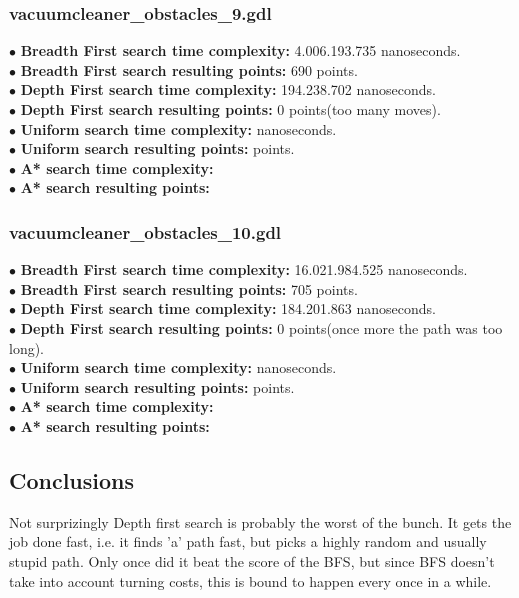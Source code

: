 \documentclass[11pt]{article}
\begin{document}
\subsubsection{vacuumcleaner\_obstacles\_9.gdl}
$\bullet$ {\bf Breadth First search time complexity: } 4.006.193.735 nanoseconds. \\
$\bullet$ {\bf Breadth First search resulting points: } 690 points. \\
$\bullet$ {\bf Depth First search time complexity: } 194.238.702 nanoseconds.\\
$\bullet$ {\bf Depth First search resulting points: } 0 points(too many moves).\\
$\bullet$ {\bf Uniform search time complexity: } nanoseconds. \\
$\bullet$ {\bf Uniform search resulting points: } points. \\
$\bullet$ {\bf A* search time complexity: } \\ 
$\bullet$ {\bf A* search resulting points: }\\

\subsubsection{vacuumcleaner\_obstacles\_10.gdl}
$\bullet$ {\bf Breadth First search time complexity: } 16.021.984.525 nanoseconds. \\
$\bullet$ {\bf Breadth First search resulting points: } 705 points. \\
$\bullet$ {\bf Depth First search time complexity: } 184.201.863 nanoseconds.\\
$\bullet$ {\bf Depth First search resulting points: } 0 points(once more the path was too long). \\
$\bullet$ {\bf Uniform search time complexity: } nanoseconds. \\
$\bullet$ {\bf Uniform search resulting points: } points. \\
$\bullet$ {\bf A* search time complexity: } \\ 
$\bullet$ {\bf A* search resulting points: }\\

\subsection{Conclusions}
Not surprizingly Depth first search is probably the worst of the bunch. It gets the job done fast, i.e. it finds 'a' path fast, but 
picks a highly random and usually stupid path. Only once did it beat the score of 
the BFS, but since BFS doesn't take into account turning costs, this is bound to happen every once in a while.\\
\end{document}
